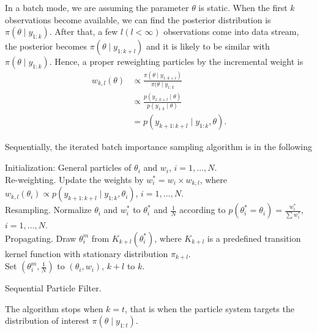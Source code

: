 In a batch mode, we are assuming the parameter $\theta$ is static. When the first $k$ observations become available, we can find the posterior distribution is $\pi(\theta\mid y_{1:k})$. After that, a few $l (l<\infty)$ observations come into data stream, the posterior becomes $\pi(\theta\mid y_{1:k+l})$ and it is likely to be similar with $\pi(\theta\mid y_{1:k})$.  Hence, a proper reweighting particles by the incremental weight is 
\begin{align*}
w_{k,l}(\theta) &\propto \frac{\pi(\theta\mid y_{1:k+l}) }{\pi(\theta\mid y_{1:k}} \\
&\propto \frac{p(y_{1:k+l}\mid \theta) }{p(y_{1:k}\mid\theta)} \\
&=p(y_{k+1:k+l}\mid y_{1:k},\theta). 
\end{align*}

Sequentially, the iterated batch importance sampling algorithm is in the following 
\begin{algorithm}[h]
\SetAlgoLined 
Initialization:  General particles of $\theta_i$ and $w_i$, $i=1,\dots,N$.\\
 {Re-weighting. Update the weights by $w_i^*=w_i \times w_{k,l}$, where $w_{k,l}(\theta_i)\propto p(y_{k+1:k+l}\mid y_{1:k},\theta_i)$, $i=1,\dots,N$. \\
Resampling. Normalize $\theta_i$ and $w^*_i$ to $\theta_i^*$ and $\frac{1}{N}$ according to $p(\theta_i^*=\theta_i)=\frac{w_i^*}{\sum w_i^*}$,  $i=1,\dots,N$. \\
Propagating. Draw $\theta_i^m$ from $K_{k+l}(\theta_i^*)$, where $K_{k+l}$ is a predefined transition kernel function with stationary distribution $\pi_{k+l}$.\\
Set $(\theta_i^m,\frac{1}{N})$ to $(\theta_i,w_i)$, $k+l$ to $k$.}
 \caption{Sequential Particle Filter.}\label{algorithmSequentialPF}
\end{algorithm}
The algorithm stops when $k=t$, that is when the particle system targets the distribution of interest $\pi(\theta\mid y_{1:t})$. 


